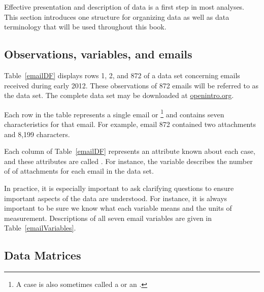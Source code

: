 Effective presentation and description of data is a first step in most analyses. This section introduces one structure for organizing data as well as data terminology that will be used throughout this book.

\subsection{Observations, variables, and emails}

Table~\ref{emailDF} displays rows 1, 2, and 872 of a data set concerning emails received during early 2012. These observations of 872 emails will be referred to as the  data set. The complete data set may be downloaded at \href{http://www.openintro.org/downloads.php}{openintro.org}.

Each row in the table represents a single email or \footnote{A case is also sometimes called a  or an .} and contains seven characteristics for that email. For example, email 872 contained two attachments and 8,199 characters.

Each column of Table~\ref{emailDF} represents an attribute known about each case, and these attributes are called . For instance, the  variable describes the number of  of attachments for each email in the data set.

In practice, it is especially important to ask clarifying questions to ensure important aspects of the data are understood. For instance, it is always important to be sure we know what each variable means and the units of measurement. Descriptions of all seven email variables are given in Table~\ref{emailVariables}. %


\subsection{Data Matrices}

